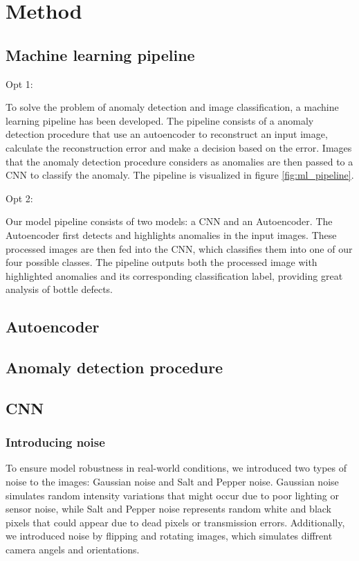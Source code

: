 \section{Method}

\subsection{Machine learning pipeline}
Opt 1:
\par
To solve the problem of anomaly detection and image classification, a machine learning pipeline has been developed. The pipeline consists of a anomaly detection procedure that use an autoencoder to reconstruct an input image, calculate the reconstruction error and make a decision based on the error. Images that the anomaly detection procedure considers as anomalies are then passed to a CNN to classify the anomaly. The pipeline is visualized in figure \ref{fig:ml_pipeline}.

\par
Opt 2:
\par
Our model pipeline consists of two models: a CNN and an Autoencoder. 
The Autoencoder first detects and highlights anomalies in the input images. These processed images are then fed into the CNN, which classifies them into one of our four possible classes.
The pipeline outputs both the processed image with highlighted anomalies and its corresponding classification label, providing great analysis of bottle defects.

\subsection{Autoencoder}

\subsection{Anomaly detection procedure}

\subsection{CNN}

\subsubsection{Introducing noise}
To ensure model robustness in real-world conditions, we introduced two types of noise to the images: Gaussian noise and Salt and Pepper noise. 
Gaussian noise simulates random intensity variations that might occur due to poor lighting or sensor noise, while Salt and Pepper noise represents random white and black pixels that could appear due to dead pixels or transmission errors.
Additionally, we introduced noise by flipping and rotating images, which simulates diffrent camera angels and orientations.

